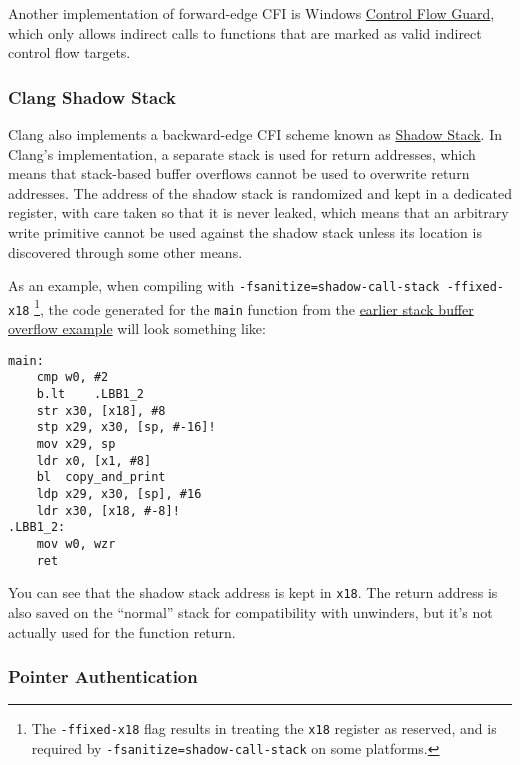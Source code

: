 \documentclass[
  a4paper,
]{report}
\begin{document}
Another implementation of forward-edge CFI is Windows
\href{https://docs.microsoft.com/en-us/windows/win32/secbp/control-flow-guard}{Control
Flow Guard}, which only allows indirect calls to functions that are
marked as valid indirect control flow targets.

\hypertarget{clang-shadow-stack}{%
\subsubsection{Clang Shadow Stack}\label{clang-shadow-stack}}

Clang also implements a backward-edge CFI scheme known as
\href{https://clang.llvm.org/docs/ShadowCallStack.html}{Shadow
Stack}. In Clang's implementation, a separate stack
is used for return addresses, which means that stack-based buffer
overflows cannot be used to overwrite return addresses. The address of
the shadow stack is randomized and kept in a dedicated register, with
care taken so that it is never leaked, which means that an arbitrary
write primitive cannot be used against the shadow stack unless its
location is discovered through some other means.

As an example, when compiling with
\texttt{-fsanitize=shadow-call-stack\ -ffixed-x18} \footnote{The
  \texttt{-ffixed-x18} flag results in treating the \texttt{x18}
  register as reserved, and is required by
  \texttt{-fsanitize=shadow-call-stack} on some platforms.}, the code
generated for the \texttt{main} function from the
\protect\hyperlink{stack-buffer-overflow}{earlier stack buffer overflow
example} will look something like:

\begin{verbatim}
main:
    cmp w0, #2
    b.lt    .LBB1_2
    str x30, [x18], #8
    stp x29, x30, [sp, #-16]!
    mov x29, sp
    ldr x0, [x1, #8]
    bl  copy_and_print
    ldp x29, x30, [sp], #16
    ldr x30, [x18, #-8]!
.LBB1_2:
    mov w0, wzr
    ret
\end{verbatim}

You can see that the shadow stack address is kept in \texttt{x18}. The
return address is also saved on the ``normal'' stack for compatibility
with unwinders, but it's not actually used for the function return.

\hypertarget{pointer-authentication}{%
\subsubsection{Pointer Authentication}\label{pointer-authentication}}
\end{document}
